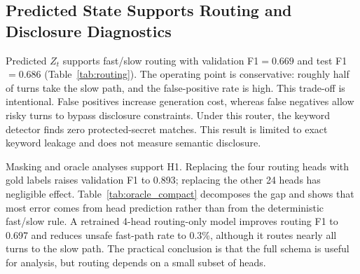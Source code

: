 \documentclass[11pt]{article}
\begin{document}
\subsection{Predicted State Supports Routing and Disclosure Diagnostics}

Predicted $Z_t$ supports fast/slow routing with validation F1$=0.669$ and test F1$=0.686$ (Table~\ref{tab:routing}). The operating point is conservative: roughly half of turns take the slow path, and the false-positive rate is high. This trade-off is intentional. False positives increase generation cost, whereas false negatives allow risky turns to bypass disclosure constraints. Under this router, the keyword detector finds zero protected-secret matches. This result is limited to exact keyword leakage and does not measure semantic disclosure.

\begin{table}[t]
\centering
\caption{Routing with predicted $Z_t$. Qwen3-4B best checkpoint; single-seed deployment-style evaluation.}
\label{tab:routing}
\small
{}
\end{table}

Masking and oracle analyses support H1. Replacing the four routing heads with gold labels raises validation F1 to 0.893; replacing the other 24 heads has negligible effect. Table~\ref{tab:oracle_compact} decomposes the gap and shows that most error comes from head prediction rather than from the deterministic fast/slow rule. A retrained 4-head routing-only model improves routing F1 to 0.697 and reduces unsafe fast-path rate to 0.3\%, although it routes nearly all turns to the slow path. The practical conclusion is that the full schema is useful for analysis, but routing depends on a small subset of heads.

\begin{table}[t]
\centering
\caption{Oracle and retraining compression analyses on validation turns. Unsafe FP = unsafe fast-path rate.}
\label{tab:oracle_compact}
\small
{}
\end{table}
\end{document}
